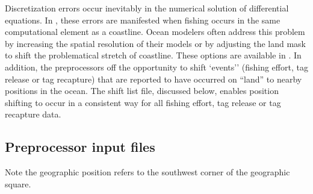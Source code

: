 Discretization errors occur inevitably in the numerical solution of
differential equations. In \TT, these errors are manifested when
fishing occurs in the same computational element as a coastline. Ocean
modelers often address this problem by increasing the spatial
resolution of their models or by adjusting the land mask to shift the
problematical stretch of coastline. These options are available in
\TT. In addition, the preprocessors off the opportunity to shift
`events'' (fishing effort, tag release or tag recapture) that are
reported to have occurred on ``land'' to nearby positions in the
ocean. The shift list file, discussed below, enables position shifting
to occur in a consistent way for  all fishing effort, tag release or
tag recapture data.

\subsection*{Preprocessor input files}
Note the geographic position refers to the southwest corner of the geographic square.
